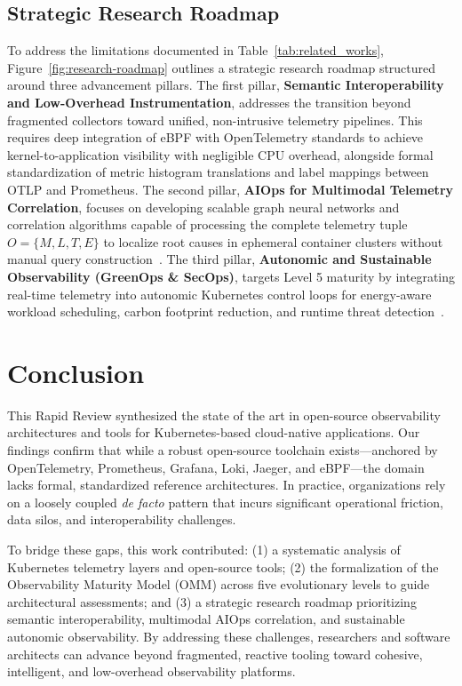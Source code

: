 \documentclass[sigconf, anonymous, balance=false]{acmart}
\begin{document}
\subsection{Strategic Research Roadmap}
To address the limitations documented in Table~\ref{tab:related_works}, Figure~\ref{fig:research-roadmap} outlines a strategic research roadmap structured around three advancement pillars. The first pillar, \textbf{Semantic Interoperability and Low-Overhead Instrumentation}, addresses the transition beyond fragmented collectors toward unified, non-intrusive telemetry pipelines. This requires deep integration of eBPF with OpenTelemetry standards to achieve kernel-to-application visibility with negligible CPU overhead, alongside formal standardization of metric histogram translations and label mappings between OTLP and Prometheus. The second pillar, \textbf{AIOps for Multimodal Telemetry Correlation}, focuses on developing scalable graph neural networks and correlation algorithms capable of processing the complete telemetry tuple $O = \{M, L, T, E\}$ to localize root causes in ephemeral container clusters without manual query construction~\cite{han_2024}. The third pillar, \textbf{Autonomic and Sustainable Observability (GreenOps \& SecOps)}, targets Level 5 maturity by integrating real-time telemetry into autonomic Kubernetes control loops for energy-aware workload scheduling, carbon footprint reduction, and runtime threat detection~\cite{deng_2024, kosinska_2023}.

\section{Conclusion}
\label{sec:conclusion}

This Rapid Review synthesized the state of the art in open-source observability architectures and tools for Kubernetes-based cloud-native applications. Our findings confirm that while a robust open-source toolchain exists—anchored by OpenTelemetry, Prometheus, Grafana, Loki, Jaeger, and eBPF—the domain lacks formal, standardized reference architectures. In practice, organizations rely on a loosely coupled \textit{de facto} pattern that incurs significant operational friction, data silos, and interoperability challenges.

To bridge these gaps, this work contributed: (1) a systematic analysis of Kubernetes telemetry layers and open-source tools; (2) the formalization of the Observability Maturity Model (OMM) across five evolutionary levels to guide architectural assessments; and (3) a strategic research roadmap prioritizing semantic interoperability, multimodal AIOps correlation, and sustainable autonomic observability. By addressing these challenges, researchers and software architects can advance beyond fragmented, reactive tooling toward cohesive, intelligent, and low-overhead observability platforms.
\end{document}
